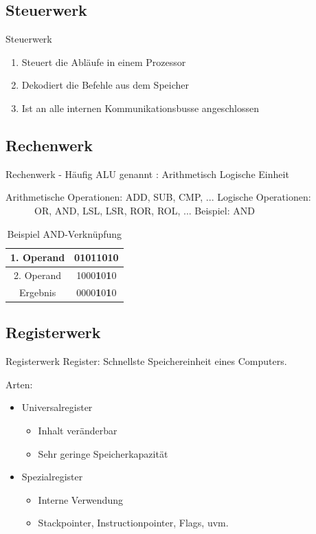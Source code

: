 \documentclass{beamer}
\begin{document}
\subsection{Steuerwerk}
\begin{frame}{Steuerwerk}
\begin{enumerate}
\item{Steuert die Abl\"aufe in einem Prozessor}
\item{Dekodiert die Befehle aus dem Speicher}
\item{Ist an alle internen Kommunikationsbusse angeschlossen}
\end{enumerate}
\end{frame}



\subsection{Rechenwerk}
\begin{frame}[t]{Rechenwerk}
- H\"aufig ALU genannt : Arithmetisch Logische Einheit \par \bigskip
Arithmetische Operationen: ADD, SUB, CMP, ...\newline
Logische Operationen: \ \ \ \ \ \ OR, AND, LSL, LSR, ROR, ROL, ...
Beispiel: AND 
\pause
\begin{table}[]
\begin{tabular}{|c|c|}
\hline
1. Operand & 0101\textbf{1}0\textbf{1}0 \\ \hline
2. Operand & 1000\textbf{1}0\textbf{1}0 \\ \hline\hline
Ergebnis   & 0000\textbf{1}0\textbf{1}0 \\ \hline
\end{tabular}
\centering
\caption{Beispiel AND-Verkn\"upfung}
\end{table}
\end{frame}


\subsection{Registerwerk}
\begin{frame}[t]{Registerwerk}
Register: Schnellste Speichereinheit eines Computers.
\par\smallskip
Arten:
\begin{itemize}
\item Universalregister
\begin{itemize}
\item Inhalt ver\"anderbar
\item Sehr geringe Speicherkapazit\"at
\smallskip
\end{itemize}
\item Spezialregister
\begin{itemize}
\item Interne Verwendung
\item Stackpointer, Instructionpointer, Flags, uvm.
\end{itemize}
\end{itemize}
\end{frame}
\end{document}
